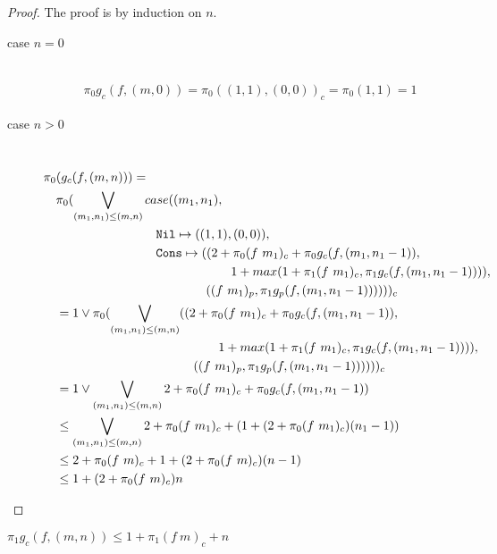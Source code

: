 \begin{proof}
   The proof is by induction on $n$.
  \begin{description}
    \item[case $n=0$]\mbox{}\\[-1.5\baselineskip]
      \begin{align*}
      \pi_0 g_c(f, (m, 0)) = \pi_0((1, 1), (0, 0))_c = \pi_0(1, 1) = 1
      \end{align*}
    \item[case $n>0$]\mbox{}\\[-1.5\baselineskip]
      \[\begin{split}
        &\pi_0(g_c(f, (m, n))) = \\
        &\quad \pi_0(\bigvee\limits_{(m_1, n_1) \leq (m, n)} case((m_1, n_1), \\
        &\quadfive\quadfour \T{Nil} \mapsto ((1, 1), (0, 0)), \\
        &\quadfive\quadfour \T{Cons} \mapsto ((2 + \pi_0(f\ m_1)_c + \pi_0g_c(f, (m_1, n_1-1)), \\
        &\quadfive\quadten                     1 + max(1 + \pi_1(f\ m_1)_c, \pi_1g_c(f, (m_1, n_1-1)))), \\
        &\quadfive\quadeight                  ((f\ m_1)_p, \pi_1 g_p(f, (m_1, n_1-1))))) )_c \\
        &\quad = 1 \vee \pi_0(\bigvee\limits_{(m_1, n_1) \leq (m, n)} ((2 + \pi_0(f\ m_1)_c + \pi_0g_c(f, (m_1, n_1-1)), \\
        &\quadfour\quadten                     1 + max(1 + \pi_1(f\ m_1)_c, \pi_1g_c(f, (m_1, n_1-1)))), \\
        &\quadfour\quadeight                  ((f\ m_1)_p, \pi_1 g_p(f, (m_1, n_1-1))))) )_c \\
        &\quad = 1 \vee \bigvee\limits_{(m_1, n_1) \leq (m, n)} 2 + \pi_0 (f\ m_1)_c + \pi_0 g_c(f, (m_1, n_1-1)) \\
        &\quad \leq \bigvee\limits_{(m_1, n_1) \leq (m, n)} 2 + \pi_0 (f\ m_1)_c + (1 + (2 + \pi_0 (f\ m_1)_c)(n_1-1)) \\
        &\quad \leq 2 + \pi_0 (f\ m)_c + 1 + (2 + \pi_0 (f\ m)_c)(n - 1) \\
        &\quad \leq 1 + (2 + \pi_0 (f\ m)_c)n \\
      \end{split}\]
  \end{description}
\end{proof}
%
\begin{lemma}
  $\pi_1 g_c(f, (m, n)) \leq 1 + \pi_1 (f\ m)_c + n$
\end{lemma}
